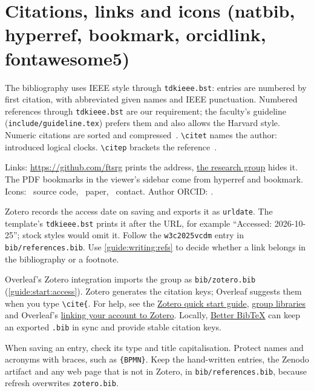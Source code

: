 \section{Citations, links and icons (natbib, hyperref, bookmark, orcidlink, fontawesome5)}\label{guide:latex:cite}
The bibliography uses IEEE style through \texttt{tdkieee.bst}: entries are numbered by first citation, with abbreviated given names and IEEE punctuation. Numbered references through \texttt{tdkieee.bst} are our requirement; the faculty's guideline (\texttt{include/guideline.tex}) prefers them and also allows the Harvard style. Numeric citations are sorted and compressed~\cite{guide:w3c2025vcdm,guide:lamport1978time}.
\texttt{\textbackslash citet} names the author: \citet{guide:lamport1978time} introduced logical clocks.
\texttt{\textbackslash citep} brackets the reference~\citep{guide:lamport1978time}.

Links: \url{https://github.com/ftsrg} prints the address, \href{https://ftsrg.mit.bme.hu}{the research group} hides it.
The PDF bookmarks in the viewer's sidebar come from hyperref and bookmark.
Icons: \faGithub~source code, \faFilePdf~paper, \faEnvelope~contact. Author ORCID: .

Zotero records the access date on saving and exports it as \texttt{urldate}. The template's \texttt{tdkieee.bst} prints it after the URL, for example \enquote{Accessed: 2026-10-25}; stock styles would omit it. Follow the \texttt{w3c2025vcdm} entry in \texttt{bib/references.bib}. Use \cref{guide:writing:refs} to decide whether a link belongs in the bibliography or a footnote.

Overleaf's Zotero integration imports the group as \texttt{bib/zotero.bib} (\cref{guide:start:access}). Zotero generates the citation keys; Overleaf suggests them when you type \texttt{\textbackslash cite\{}. For help, see the \href{https://www.zotero.org/support/quick_start_guide}{Zotero quick start guide}, \href{https://www.zotero.org/support/groups}{group libraries} and Overleaf's \href{https://www.overleaf.com/learn/how-to/How_to_link_your_Overleaf_account_to_Mendeley_and_Zotero}{linking your account to Zotero}. Locally, \href{https://retorque.re/zotero-better-bibtex/}{Better BibTeX} can keep an exported \texttt{.bib} in sync and provide stable citation keys.

When saving an entry, check its type and title capitalisation. Protect names and acronyms with braces, such as \texttt{\{BPMN\}}. Keep the hand-written entries, the Zenodo artifact and any web page that is not in Zotero, in \texttt{bib/references.bib}, because refresh overwrites \texttt{zotero.bib}.

